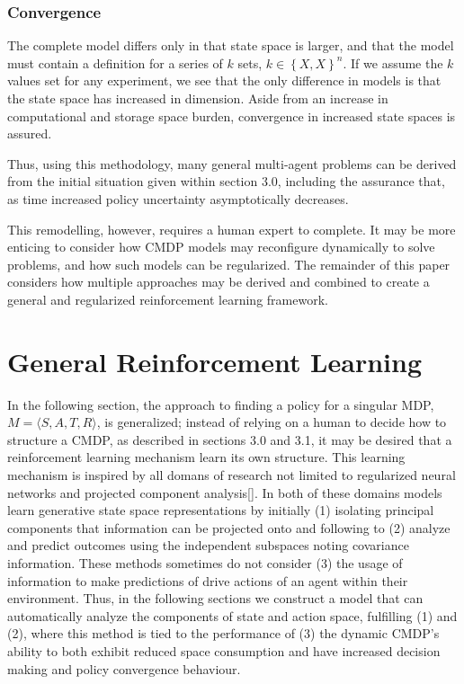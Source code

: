 \documentclass[compsoc,journal,letterpaper,10pt,draftclsnofoot,onecolumn]{IEEEtran}
\begin{document}
\subsubsection{Convergence}\label{convergence-2}

The complete model differs only in that state space is larger, and that
the model must contain a definition for a series of \(k\) sets,
\(k \in \left\{ X,X \right\}^{n}\). If we assume the \(k\) values set
for any experiment, we see that the only difference in models is that
the state space has increased in dimension. Aside from an increase in
computational and storage space burden, convergence in increased state
spaces is assured.

Thus, using this methodology, many general multi-agent problems can be
derived from the initial situation given within section 3.0, including
the assurance that, as time increased policy uncertainty asymptotically
decreases.

This remodelling, however, requires a human expert to complete. It may
be more enticing to consider how CMDP models may reconfigure dynamically
to solve problems, and how such models can be regularized. The remainder
of this paper considers how multiple approaches may be derived and
combined to create a general and regularized reinforcement learning
framework.

\section{General Reinforcement
Learning}\label{general-reinforcement-learning}

In the following section, the approach to finding a policy for a
singular MDP, \(M = \langle S, A, T, R \rangle \), is generalized; instead of relying on
a human to decide how to structure a CMDP, as described in sections 3.0
and 3.1, it may be desired that a reinforcement learning mechanism learn
its own structure. This learning mechanism is inspired by all domans of
research not limited to regularized neural networks and projected
component analysis{[}{]}. In both of these domains models learn
generative state space representations by initially (1) isolating
principal components that information can be projected onto and
following to (2) analyze and predict outcomes using the independent
subspaces noting covariance information. These methods sometimes do not
consider (3) the usage of information to make predictions of drive
actions of an agent within their environment. Thus, in the following
sections we construct a model that can automatically analyze the
components of state and action space, fulfilling (1) and (2), where this
method is tied to the performance of (3) the dynamic CMDP's ability to
both exhibit reduced space consumption and have increased decision
making and policy convergence behaviour.
\end{document}
